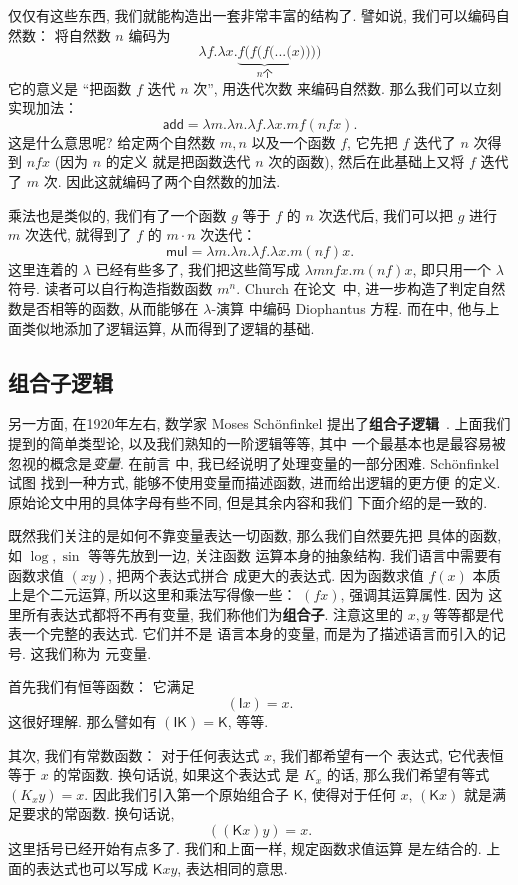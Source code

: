 \documentclass[UTF8]{ctexbook}
\newcommand{\cons}[1]{\textsf{#1}}
\theoremstyle{plain}
\theoremstyle{definition}
\theoremstyle{remark}
\begin{document}
仅仅有这些东西, 我们就能构造出一套非常丰富的结构了. 譬如说,
我们可以编码自然数： 将自然数 \(n\) 编码为
\[\lambda f. \lambda x. \underbrace{f(f(f(...(}_{n\text{个}}x))))\]
它的意义是 “把函数 \(f\) 迭代 \(n\) 次”, 用迭代次数
来编码自然数. 那么我们可以立刻实现加法：
\[\cons{add} = \lambda m. \lambda n. \lambda f. \lambda x. mf(nfx).\]
这是什么意思呢? 给定两个自然数 \(m, n\) 以及一个函数 \(f\),
它先把 \(f\) 迭代了 \(n\) 次得到 \(nfx\) (因为 \(n\) 的定义
就是把函数迭代 \(n\) 次的函数), 然后在此基础上又将
\(f\) 迭代了 \(m\) 次. 因此这就编码了两个自然数的加法.

乘法也是类似的, 我们有了一个函数 \(g\) 等于 \(f\) 的 \(n\)
次迭代后, 我们可以把 \(g\) 进行 \(m\) 次迭代, 就得到了
\(f\) 的 \(m\cdot n\) 次迭代：
\[\cons{mul} = \lambda m. \lambda n. \lambda f. \lambda x. m(nf)x.\]
这里连着的 \(\lambda\) 已经有些多了, 我们把这些简写成
\(\lambda mnfx. m(nf)x\), 即只用一个 \(\lambda\) 符号.
读者可以自行构造指数函数 \(m^n\). Church 在论文~\cite{church:1936:lambda}中,
进一步构造了判定自然数是否相等的函数, 从而能够在 \(\lambda\)-演算
中编码 Diophantus 方程. 而在\cite{church:1932:untyped}中,
他与上面类似地添加了逻辑运算, 从而得到了逻辑的基础.

\subsection{组合子逻辑}
另一方面, 在1920年左右, 数学家 Moses Sch\"onfinkel 提出了\textbf{组合子逻辑}~\cite{schonfinkel:1924:combinator}.
上面我们提到的简单类型论, 以及我们熟知的一阶逻辑等等, 其中
一个最基本也是最容易被忽视的概念是\emph{变量}. 在前言
中, 我已经说明了处理变量的一部分困难. Sch\"onfinkel 试图
找到一种方式, 能够不使用变量而描述函数, 进而给出逻辑的更方便
的定义. 原始论文中用的具体字母有些不同, 但是其余内容和我们
下面介绍的是一致的.

既然我们关注的是如何不靠变量表达一切函数, 那么我们自然要先把
具体的函数, 如 \(\log, \sin\) 等等先放到一边, 关注函数
运算本身的抽象结构. 我们语言中需要有函数求值 \((xy)\), 把两个表达式拼合
成更大的表达式. 因为函数求值 \(f(x)\) 本质上是个二元运算,
所以这里和乘法写得像一些： \((fx)\), 强调其运算属性. 因为
这里所有表达式都将不再有变量, 我们称他们为\textbf{组合子}.
注意这里的 \(x,y\) 等等都是代表一个完整的表达式. 它们并不是
语言本身的变量, 而是为了描述语言而引入的记号. 这我们称为
元变量.

首先我们有恒等函数： 它满足
\[(\cons{I}x) = x.\]
这很好理解. 那么譬如有 \((\cons{I}\cons{K}) = \cons{K}\),
等等.

其次, 我们有常数函数： 对于任何表达式 \(x\), 我们都希望有一个
表达式, 它代表恒等于 \(x\) 的常函数. 换句话说, 如果这个表达式
是 \(K_x\) 的话, 那么我们希望有等式
\((K_xy) = x\).
因此我们引入第一个原始组合子 \(\cons{K}\), 使得对于任何
\(x\), \((\cons{K}x)\) 就是满足要求的常函数. 换句话说,
\[((\cons{K}x)y) = x.\]
这里括号已经开始有点多了. 我们和上面一样, 规定函数求值运算
是左结合的. 上面的表达式也可以写成 \(\cons{K}xy\),
表达相同的意思.
\end{document}
